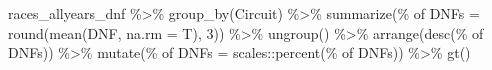 \documentclass[
]{book}
\newenvironment{Shaded}{\begin{snugshade}}{\end{snugshade}}
\newcommand{\AttributeTok}[1]{\textcolor[rgb]{0.77,0.63,0.00}{#1}}
\newcommand{\DecValTok}[1]{\textcolor[rgb]{0.00,0.00,0.81}{#1}}
\newcommand{\FunctionTok}[1]{\textcolor[rgb]{0.00,0.00,0.00}{#1}}
\newcommand{\NormalTok}[1]{#1}
\newcommand{\OtherTok}[1]{\textcolor[rgb]{0.56,0.35,0.01}{#1}}
\newcommand{\SpecialCharTok}[1]{\textcolor[rgb]{0.00,0.00,0.00}{#1}}
\newcommand{\StringTok}[1]{\textcolor[rgb]{0.31,0.60,0.02}{#1}}
\begin{document}
\begin{Shaded}
\begin{Highlighting}[]
\NormalTok{races\_allyears\_dnf }\SpecialCharTok{\%\textgreater{}\%}
  \FunctionTok{group\_by}\NormalTok{(Circuit) }\SpecialCharTok{\%\textgreater{}\%}
  \FunctionTok{summarize}\NormalTok{(}\StringTok{\textasciigrave{}}\AttributeTok{\% of DNFs}\StringTok{\textasciigrave{}} \OtherTok{=} \FunctionTok{round}\NormalTok{(}\FunctionTok{mean}\NormalTok{(DNF, }\AttributeTok{na.rm =}\NormalTok{ T), }\DecValTok{3}\NormalTok{)) }\SpecialCharTok{\%\textgreater{}\%}
  \FunctionTok{ungroup}\NormalTok{() }\SpecialCharTok{\%\textgreater{}\%}
  \FunctionTok{arrange}\NormalTok{(}\FunctionTok{desc}\NormalTok{(}\StringTok{\textasciigrave{}}\AttributeTok{\% of DNFs}\StringTok{\textasciigrave{}}\NormalTok{)) }\SpecialCharTok{\%\textgreater{}\%}
  \FunctionTok{mutate}\NormalTok{(}\StringTok{\textasciigrave{}}\AttributeTok{\% of DNFs}\StringTok{\textasciigrave{}} \OtherTok{=}\NormalTok{ scales}\SpecialCharTok{::}\FunctionTok{percent}\NormalTok{(}\StringTok{\textasciigrave{}}\AttributeTok{\% of DNFs}\StringTok{\textasciigrave{}}\NormalTok{)) }\SpecialCharTok{\%\textgreater{}\%} 
  \FunctionTok{gt}\NormalTok{()}
\end{Highlighting}
\end{Shaded}
\end{document}
